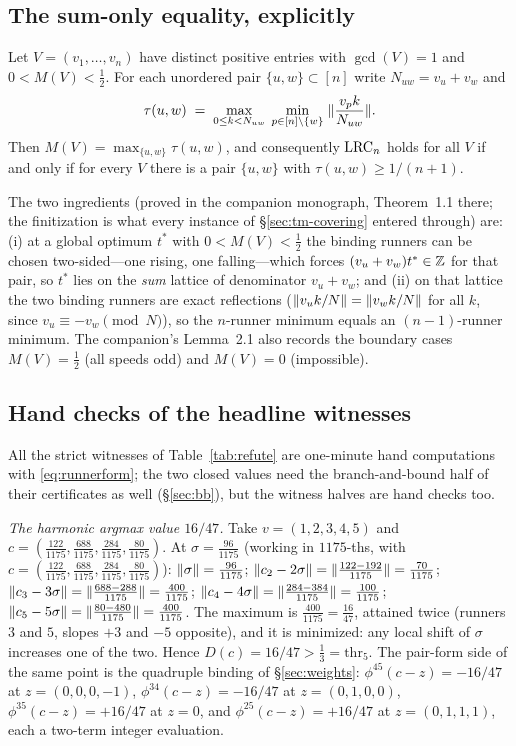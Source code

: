 \subsection{The sum-only equality, explicitly}

\begin{theorem}\label{thm:equality-explicit}
Let $V=(v_1,\dots,v_n)$ have distinct positive entries with $\gcd(V)=1$
and $0<M(V)<\tfrac12$. For each unordered pair $\{u,w\}\subset[n]$ write
$N_{uw}=v_u+v_w$ and
\[
\tau(u,w)\;=\;\max_{0\le k<N_{uw}}\;\min_{p\in[n]\setminus\{w\}}\;
\lVert \frac{v_pk}{N_{uw}} \rVert.
\]
Then $M(V)=\max_{\{u,w\}}\tau(u,w)$, and consequently $\mathrm{LRC}_n$ holds
for all $V$ if and only if for every $V$ there is a pair $\{u,w\}$ with
$\tau(u,w)\ge 1/(n+1)$.
\end{theorem}

The two ingredients (proved in the companion monograph, Theorem~1.1
there; the finitization is what every instance of \S\ref{sec:tm-covering}
entered through) are: (i) at a global optimum $t^\ast$ with
$0<M(V)<\tfrac12$ the binding runners can be chosen two-sided---one
rising, one falling---which forces $(v_u+v_w)t^\ast\in\mathbb{Z}$ for that pair,
so $t^\ast$ lies on the \emph{sum} lattice of denominator $v_u+v_w$; and
(ii) on that lattice the two binding runners are exact reflections
($\lVert v_uk/N \rVert=\lVert v_wk/N \rVert$ for all $k$, since $v_u\equiv-v_w \pmod N$),
so the $n$-runner minimum equals an $(n-1)$-runner minimum. The
companion's Lemma~2.1 also records the boundary cases $M(V)=\tfrac12$
(all speeds odd) and $M(V)=0$ (impossible).

\subsection{Hand checks of the headline witnesses}

All the strict witnesses of Table~\ref{tab:refute} are one-minute hand
computations with \eqref{eq:runnerform}; the two closed values need the
branch-and-bound half of their certificates as well
(\S\ref{sec:bb}), but the witness halves are hand checks too.

\emph{The harmonic argmax value $16/47$.} Take $v=(1,2,3,4,5)$ and
$c=(\tfrac{122}{1175},\tfrac{688}{1175},\tfrac{284}{1175},
\tfrac{80}{1175})$. At $\sigma=\tfrac{96}{1175}$ (working in
$1175$-ths, with $c=(\tfrac{122}{1175},\tfrac{688}{1175},
\tfrac{284}{1175},\tfrac{80}{1175})$):
$\lVert \sigma \rVert=\tfrac{96}{1175}$;
$\lVert c_2-2\sigma \rVert=\lVert \tfrac{122-192}{1175} \rVert=\tfrac{70}{1175}$;
$\lVert c_3-3\sigma \rVert=\lVert \tfrac{688-288}{1175} \rVert=\tfrac{400}{1175}$;
$\lVert c_4-4\sigma \rVert=\lVert \tfrac{284-384}{1175} \rVert=\tfrac{100}{1175}$;
$\lVert c_5-5\sigma \rVert=\lVert \tfrac{80-480}{1175} \rVert=\tfrac{400}{1175}$.
The maximum is $\tfrac{400}{1175}=\tfrac{16}{47}$, attained twice
(runners $3$ and $5$, slopes $+3$ and $-5$ opposite), and it is
minimized: any local shift of $\sigma$ increases one of the two. Hence
$D(c)=16/47>\tfrac13=\mathrm{thr}_5$. The pair-form side of the same
point is the quadruple binding of \S\ref{sec:weights}:
$\phi^{45}(c-z)=-16/47$ at $z=(0,0,0,-1)$, $\phi^{34}(c-z)=-16/47$ at
$z=(0,1,0,0)$, $\phi^{35}(c-z)=+16/47$ at $z=0$, and
$\phi^{25}(c-z)=+16/47$ at $z=(0,1,1,1)$, each a two-term integer
evaluation.


